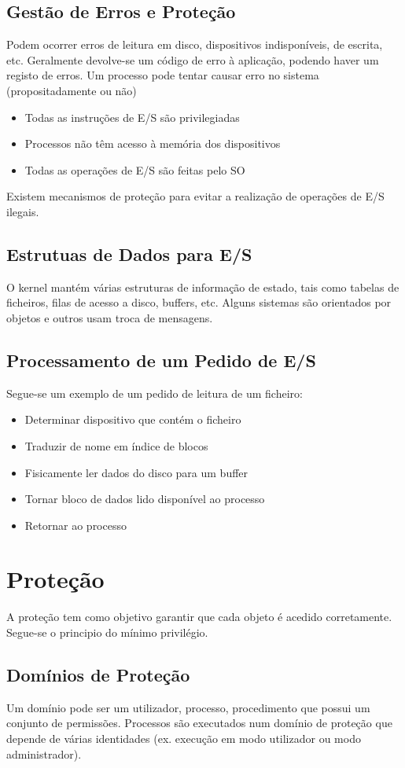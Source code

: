 \documentclass[10pt,a4paper]{report}
\begin{document}
\subsection{Gestão de Erros e Proteção}
Podem ocorrer erros de leitura em disco, dispositivos indisponíveis, de escrita, etc. Geralmente devolve-se um código de erro à aplicação, podendo haver um registo de erros. Um processo pode tentar causar erro no sistema (propositadamente ou não)
\begin{itemize}
\item Todas as instruções de E/S são privilegiadas
\item Processos não têm acesso à memória dos dispositivos
\item Todas as operações de E/S são feitas pelo SO
\end{itemize}
Existem mecanismos de proteção para evitar a realização de operações de E/S ilegais.
\subsection{Estrutuas de Dados para E/S}
O kernel mantém várias estruturas de informação de estado, tais como tabelas de ficheiros, filas de acesso a disco, buffers, etc. Alguns sistemas são orientados por objetos e outros usam troca de mensagens.
\subsection{Processamento de um Pedido de E/S}
Segue-se um exemplo de um pedido de leitura de um ficheiro:
\begin{itemize}
\item Determinar dispositivo que contém o ficheiro
\item Traduzir de nome em índice de blocos
\item Fisicamente ler dados do disco para um buffer
\item Tornar bloco de dados lido disponível ao processo
\item Retornar ao processo
\end{itemize}
\section{Proteção}
A proteção tem como objetivo garantir que cada objeto é acedido corretamente. Segue-se o principio do mínimo privilégio.
\subsection{Domínios de Proteção}
Um domínio pode ser um utilizador, processo, procedimento que possui um conjunto de permissões. Processos são executados num domínio de proteção que depende de várias identidades (ex. execução em modo utilizador ou modo administrador).
\end{document}

